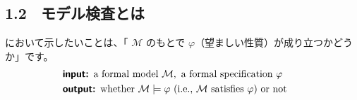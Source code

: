 \documentclass[
		head_space=20mm,
		foot_space=20mm,
		gutter=10mm,
		line_length=190mm
]{jlreq}
\begin{document}

\clearpage

\subsection*{1.2~ モデル検査とは}

\noindent %
において示したいことは、「 $\mathcal M$ のもとで $\varphi$（望ましい性質）が成り立つかどうか」です。
\begin{align*}
	&\textsf{\textbf{input: }} \textrm{a formal model } \mathcal M, \textrm{ a formal specification } \varphi \qquad \\ &\textsf{\textbf{output: }} \textrm{whether }\mathcal M\models\varphi \textrm{ (i.e., $\mathcal M$ satisfies $\varphi$)} \textrm{ or not}
\end{align*}
\end{document}
